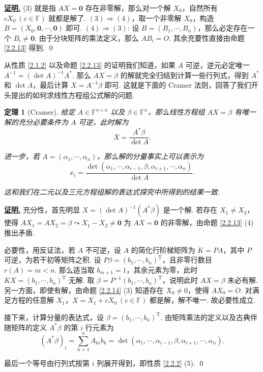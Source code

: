 \documentclass[10pt,openany]{article}
\theoremstyle{thmstyle} %
\newtheorem{theorem}{定理}[subsection]
\theoremstyle{defstyle} %
\theoremstyle{prostyle} %
\theoremstyle{exastyle}
\theoremstyle{remstyle}
\renewenvironment{proof}[1][证明]{\par\underline{\textbf{#1.}} \;\fangsong}{\qed\par}
\newcommand{\T}{^{\text{T}}}
\newcommand{\F}{\mathbb{F}}
\newcommand{\n}{^{n \times n}}
\begin{document}
\begin{proof}
	(3) 就是指 \( AX=\bm{0} \) 存在非零解，那么对一个解 \( X_0 \)，自然所有 \( cX_0 \ (c \in \F) \) 就都是解了. \( (3) \Rightarrow (4) \)，取一个非零解 \( X_0 \)，构造 \( B=(X_0,\bm{0},\cdots,\bm{0}) \) 即可. \( (4) \Rightarrow (3) \): 设 \( B=(B_1,\cdots,B_n) \)，那么必定存在一个 \( B_i \neq \bm{0} \). 由于分块矩阵的乘法定义，那么 \( AB_i=O \). 其余充要性直接由命题 \ref{2.2.13} 得到.
\end{proof}

从性质 \ref{2.1.2} 以及命题 \ref{2.2.13} 的证明我们知道，如果 \( A \) 可逆，逆元必定唯一 \( A^{-1}=(\det A)^{-1} A^* \). 那么 \( AX=\beta \) 的解就完全归结到计算一些行列式，得到 \( A^* \) 和 \( \det A \)，最后计算 \( X=A^{-1}\beta \) 即可. 这就是下面的 Cramer 法则，回答了我们开头提出的如何求线性方程组公式解的问题.

\begin{theorem}[Cramer]\label{2.2.15}
	给定 \( A \in \F\n \) 以及 \( \beta \in \F^n \)，那么线性方程组 \( AX=\beta \) 有唯一解的充分必要条件为 \( A \) 可逆，此时解为
	\[ X=\frac{A^*\beta}{\det A}. \]
	
	进一步，若 \( A=(\alpha_1,\cdots,\alpha_n) \)，那么解的分量事实上可以表示为
	\[ x_i=\frac{\det(\alpha_1,\cdots,\alpha_{i-1},\beta,\alpha_{i+1},\cdots,\alpha_n)}{\det A}. \]
	
	这和我们在二元以及三元方程组解的表达式探究中所得到的结果一致.
	
\end{theorem}

\begin{proof}
	充分性，首先明显 \( X=(\det A)^{-1}(A^*\beta) \) 是一个解. 若存在 \( X_1 \neq X_2 \)，使得 \( AX_1=AX_2=\beta \leadsto X_1-X_2 \neq \bm{0} \) 为 \( AX=\bm{0} \) 的非零解，由命题 \ref{2.2.13} (4) 推出矛盾. 
	
	必要性，用反证法，若 \( A \) 不可逆，设 \( A \) 的简化行阶梯矩阵为 \( K=PA \)，其中 \( P \) 可逆，为若干初等矩阵之积. 设 \( P\beta=(b_1,\cdots,b_n)\T \)，且非零行数目 \( r(A)=m<n \). 那么适当取 \( b_{m+1}=1 \)，其余元素为零，此时 \( KX=(b_1,\cdots,b_n)\T \) 无解. 取 \( \beta=P^{-1}(b_1,\cdots,b_n)\T \)，说明此时 \( AX=\beta \) 未必有解. 另一方面，即使有解，由命题 \ref{2.2.14} (3) 知道存在 \( X_0 \neq 0 \)，使得 \( AX_0=O \). 对满足方程的任意解 \( X_1 \)，\( X=X_1+cX_0 \ (c \in \F) \) 都是解，解不唯一. 故必要性成立.
	
	接下来，计算分量的表达式，设 \( \beta=(b_1,\cdots,b_n)\T \). 由矩阵乘法的定义以及古典伴随矩阵的定义 \( A^*\beta \) 的第 \( i \) 行元素为
	\[ (A^*\beta)_i=\sum_{k=1}^{n} A_{ki}b_k=\det(\alpha_1,\cdots,\alpha_{i-1},\beta,\alpha_{i+1},\cdots,\alpha_n). \]
	
	最后一个等号由行列式按第 \( i \) 列展开得到，即性质 \ref{2.2.2} (5).
\end{proof}
\end{document}
